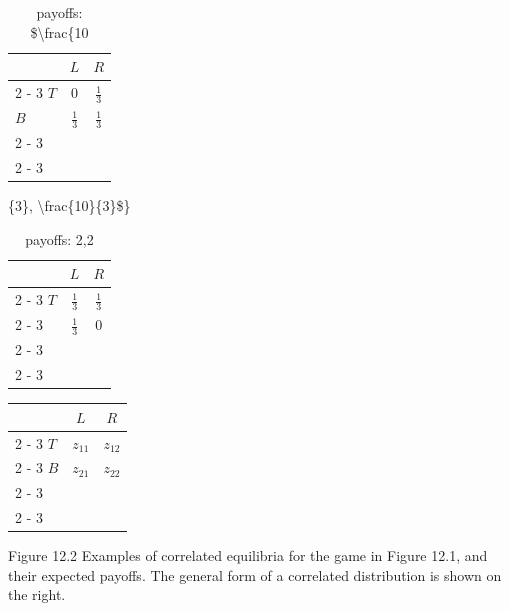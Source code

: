 \documentclass[12pt]{article}
\begin{document}
\begin{table}[h]
\begin{center}
\begin{tabular}{l|c|c|}
 & \multicolumn{1}{c}{$L$} & \multicolumn{1}{c}{$R$} \\
\cline { 2 - 3 }
$T$ & 0 & $\frac{1}{3}$ \\
$B$ & $\frac{1}{3}$ & $\frac{1}{3}$ \\
\cline { 2 - 3 }
 &  &  \\
\cline { 2 - 3 }
\end{tabular}
\captionsetup{labelformat=empty}
\caption{payoffs: \$\textbackslash frac\{10}\{3\}, \textbackslash frac\{10\}\{3\}\$\}
\end{center}
\end{table}

\begin{table}[h]
\begin{center}
\begin{tabular}{l|c|c|}
 & \multicolumn{1}{c}{$L$} & \multicolumn{1}{c}{$R$} \\
\cline { 2 - 3 }
$T$ & $\frac{1}{3}$ & $\frac{1}{3}$ \\
\cline { 2 - 3 }
 & $\frac{1}{3}$ & 0 \\
\cline { 2 - 3 }
 &  &  \\
\cline { 2 - 3 }
\end{tabular}
\captionsetup{labelformat=empty}
\caption{payoffs: 2,2}
\end{center}
\end{table}

\begin{center}
\begin{tabular}{l|c|c|}
 & \multicolumn{1}{c}{$L$} & \multicolumn{1}{c}{$R$} \\
\cline { 2 - 3 }
$T$ & $z_{11}$ & $z_{12}$ \\
\cline { 2 - 3 }
$B$ & $z_{21}$ & $z_{22}$ \\
\cline { 2 - 3 }
 &  &  \\
\cline { 2 - 3 }
\end{tabular}
\end{center}

Figure 12.2 Examples of correlated equilibria for the game in Figure 12.1, and their expected payoffs. The general form of a correlated distribution is shown on the right.
\end{document}
